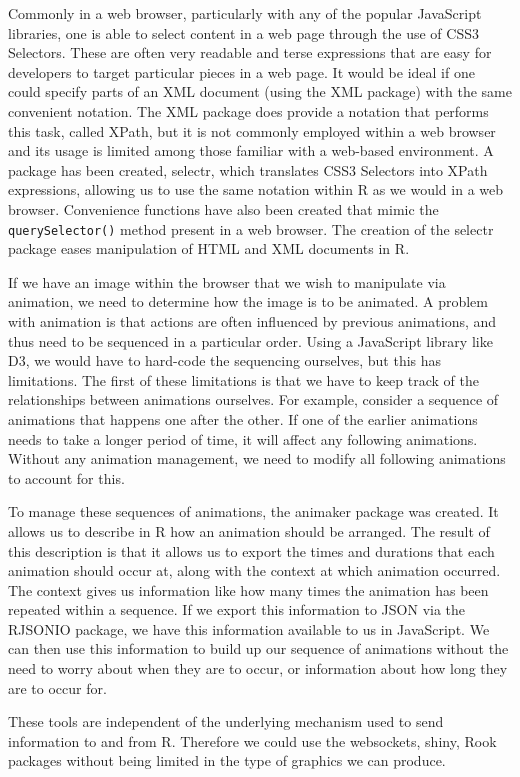 \documentclass[11pt, a4paper]{article}
\newcommand{\R}{\textsf{R}}
\newcommand{\JS}{\textsf{JavaScript}}
\newcommand{\pkg}[1]{\textsf{#1}}
\newcommand{\code}[1]{\texttt{#1}}
\newcommand{\tsc}[1]{{\small \textsc{#1}}}
\begin{document}
Commonly in a web browser, particularly with any of the popular \JS{}
libraries, one is able to select content in a web page through the use
of CSS3 Selectors. These are often very readable and terse expressions
that are easy for developers to target particular pieces in a web
page. It would be ideal if one could specify parts of an \tsc{XML}
document (using the \pkg{XML} package) with the same convenient
notation. The \pkg{XML} package does provide a notation that performs
this task, called XPath, but it is not commonly employed within a web
browser and its usage is limited among those familiar with a web-based
environment. A package has been created, \pkg{selectr}, which
translates CSS3 Selectors into XPath expressions, allowing us to use
the same notation within \R{} as we would in a web
browser. Convenience functions have also been created that mimic the
\code{querySelector()} method present in a web browser. The creation
of the \pkg{selectr} package eases manipulation of \tsc{HTML} and
\tsc{XML} documents in \R{}.

If we have an image within the browser that we wish to manipulate via
animation, we need to determine how the image is to be animated. A
problem with animation is that actions are often influenced by
previous animations, and thus need to be sequenced in a particular
order. Using a \JS{} library like D3, we would have to hard-code the
sequencing ourselves, but this has limitations. The first of these
limitations is that we have to keep track of the relationships between
animations ourselves. For example, consider a sequence of animations
that happens one after the other. If one of the earlier animations
needs to take a longer period of time, it will affect any following
animations. Without any animation management, we need to modify all
following animations to account for this.

To manage these sequences of animations, the \pkg{animaker} package
was created. It allows us to describe in \R{} how an animation should
be arranged. The result of this description is that it allows us to
export the times and durations that each animation should occur at,
along with the context at which animation occurred. The context gives
us information like how many times the animation has been repeated
within a sequence. If we export this information to \tsc{JSON} via the
\pkg{RJSONIO} package, we have this information available to us in
\JS{}. We can then use this information to build up our sequence of
animations without the need to worry about when they are to occur, or
information about how long they are to occur for.

These tools are independent of the underlying mechanism used to send
information to and from \R{}. Therefore we could use the
\pkg{websockets}, \pkg{shiny}, \pkg{Rook} packages without being
limited in the type of graphics we can produce.
\end{document}
